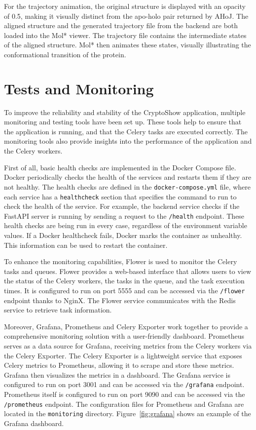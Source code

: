 For the trajectory animation, the original structure is displayed with an opacity of 0.5, making it visually distinct from the apo-holo pair returned by AHoJ. The aligned structure and the generated trajectory file from the backend are both loaded into the Mol* viewer. The trajectory file contains the intermediate states of the aligned structure. Mol* then animates these states, visually illustrating the conformational transition of the protein.


\section{Tests and Monitoring}
\label{sec:tests-monitoring}

To improve the reliability and stability of the CryptoShow application, multiple monitoring and testing tools have been set up. These tools help to ensure that the application is running, and that the Celery tasks are executed correctly. The monitoring tools also provide insights into the performance of the application and the Celery workers.

First of all, basic health checks are implemented in the Docker Compose file. Docker periodically checks the health of the services and restarts them if they are not healthy. The health checks are defined in the \lstinline!docker-compose.yml! file, where each service has a \lstinline|healthcheck| section that specifies the command to run to check the health of the service. For example, the backend service checks if the FastAPI server is running by sending a request to the \lstinline!/health! endpoint. These health checks are being run in every case, regardless of the environment variable values. If a Docker healthcheck fails, Docker marks the container as unhealthy. This information can be used to restart the container.

To enhance the monitoring capabilities, Flower is used to monitor the Celery tasks and queues. Flower provides a web-based interface that allows users to view the status of the Celery workers, the tasks in the queue, and the task execution times. It is configured to run on port 5555 and can be accessed via the \lstinline!/flower! endpoint thanks to NginX. The Flower service communicates with the Redis service to retrieve task information.

Moreover, Grafana, Prometheus and Celery Exporter work together to provide a comprehensive monitoring solution with a user-friendly dashboard. Prometheus serves as a data source for Grafana, receiving metrics from the Celery workers via the Celery Exporter. The Celery Exporter is a lightweight service that exposes Celery metrics to Prometheus, allowing it to scrape and store these metrics. Grafana then visualizes the metrics in a dashboard. The Grafana service is configured to run on port 3001 and can be accessed via the \lstinline!/grafana! endpoint. Prometheus itself is configured to run on port 9090 and can be accessed via the \lstinline!/prometheus! endpoint. The configuration files for Prometheus and Grafana are located in the \lstinline!monitoring! directory. Figure~\ref{fig:grafana} shows an example of the Grafana dashboard.

